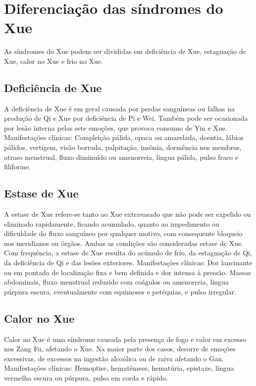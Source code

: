 \documentclass[12pt,oneside,a4paper]{book} %
\begin{document}
\section{Diferenciação das síndromes do Xue}

As síndromes do Xue podem ser divididas em deficiência de Xue, estagnação de Xue, calor no Xue e frio no Xue.

\subsection{Deficiência de Xue}
A deficiência de Xue é em geral causada por perdas sanguíneas ou falhas na produção de Qi e Xue por deficiência de Pi e Wei. Também pode ser ocasionada por lesão interna pelas sete emoções, que provoca consumo de Yin e Xue.
Manifestações clínicas: Compleição pálida, opaca ou amarelada, doentia, lábios pálidos, vertigem, visão borrada, palpitação, insônia, dormência nos membros, atraso menstrual, fluxo diminuído ou amenorreia, língua pálida, pulso fraco e filiforme.

\subsection{Estase de Xue}
A estase de Xue refere-se tanto ao Xue extravasado que não pode ser expelido ou eliminado rapidamente, ficando acumulado, quanto ao impedimento ou dificuldade do fluxo sanguíneo por qualquer motivo, com consequente bloqueio nos meridianos ou órgãos. Ambas as condições são consideradas estase de Xue. Com frequência, a estase de Xue resulta do acúmulo de frio, da estagnação de Qi, da deficiência de Qi e das lesões exteriores.
Manifestações clínicas: Dor lancinante ou em pontada de localização fixa e bem definida e dor intensa à pressão. Massas abdominais, fluxo menstrual reduzido com coágulos ou amenorreia, língua púrpura escura, eventualmente com equimoses e petéquias, e pulso irregular.

\subsection{Calor no Xue}
Calor no Xue é uma síndrome causada pela presença de fogo e calor em excesso nos Zang Fu, afetando o Xue. Na maior parte dos casos, decorre de emoções excessivas, de excessos na ingestão alcoólica ou de raiva afetando o Gan.
Manifestações clínicas: Hemoptise, hematêmese, hematúria, epistaxe, língua vermelha escura ou púrpura, pulso em corda e rápido.
\end{document}
